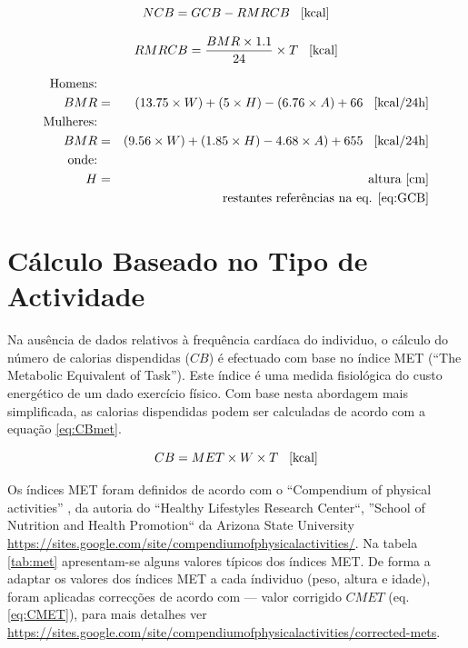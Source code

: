 \documentclass[a4paper,10pt]{report}
\begin{document}
\begin{equation} \label{eq:NCB} 
NCB = GCB - RMRCB \text{\hspace*{0.3cm}[kcal]}
\end{equation}

\begin{equation} \label{eq:RMRCB} 
RMRCB = \frac{BMR \times 1.1}{24} \times T \text{\hspace*{0.3cm}[kcal]}
\end{equation}

\begin{eqnarray} \label{eq:BMR}
\text{Homens:}&&\\
BMR &=& (13.75 \times W) + (5 \times H) - (6.76 \times A) + 66 \text{\hspace*{0.3cm}[kcal/24h]}\nonumber\\
\text{Mulheres:}&&\nonumber\\ 
BMR &=& (9.56 \times W) + (1.85 \times H) - 4.68 \times A) + 655 \text{\hspace*{0.3cm}[kcal/24h]}\nonumber\\
\text{onde:}&& \nonumber\\
H &=& \text{altura [cm]}\nonumber\\ 
&&\text{restantes referências na eq. \ref{eq:GCB}}\nonumber
\end{eqnarray}

\section{Cálculo Baseado no Tipo de Actividade}
\label{sec:caloriasMet}
Na ausência de dados relativos à frequência cardíaca do individuo, o cálculo do número de calorias dispendidas ($CB$) é efectuado com base 
no índice MET (``The Metabolic Equivalent of Task''). Este índice é uma medida fisiológica do custo energético de um dado exercício físico.
Com base nesta abordagem mais simplificada, as calorias dispendidas podem ser calculadas de acordo com a equação \ref{eq:CBmet}.

\begin{equation} \label{eq:CBmet} 
CB = MET \times W \times T \text{\hspace*{0.3cm}[kcal]}
\end{equation}

Os índices MET foram definidos de acordo com o ``Compendium of physical activities'' \cite{compendium}, da autoria do ``Healthy Lifestyles Research Center``, 
''School of Nutrition and Health Promotion`` da Arizona State University \url{https://sites.google.com/site/compendiumofphysicalactivities/}.
Na tabela \ref{tab:met} apresentam-se alguns valores típicos dos índices MET. 
De forma a adaptar os valores dos índices MET a cada índividuo (peso, altura e idade), foram aplicadas correcções de acordo com \cite{NCB} --- 
valor corrigido $CMET$ (eq. \ref{eq:CMET}), para mais detalhes ver \url{https://sites.google.com/site/compendiumofphysicalactivities/corrected-mets}.
\end{document}
